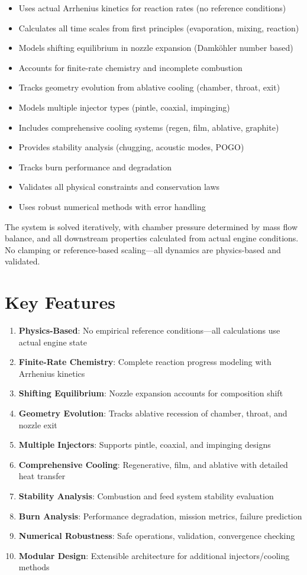 \documentclass[12pt,a4paper]{article}
\begin{document}
\begin{itemize}
    \item Uses actual Arrhenius kinetics for reaction rates (no reference conditions)
    \item Calculates all time scales from first principles (evaporation, mixing, reaction)
    \item Models shifting equilibrium in nozzle expansion (Damköhler number based)
    \item Accounts for finite-rate chemistry and incomplete combustion
    \item Tracks geometry evolution from ablative cooling (chamber, throat, exit)
    \item Models multiple injector types (pintle, coaxial, impinging)
    \item Includes comprehensive cooling systems (regen, film, ablative, graphite)
    \item Provides stability analysis (chugging, acoustic modes, POGO)
    \item Tracks burn performance and degradation
    \item Validates all physical constraints and conservation laws
    \item Uses robust numerical methods with error handling
\end{itemize}

The system is solved iteratively, with chamber pressure determined by mass flow balance, and all downstream properties calculated from actual engine conditions. No clamping or reference-based scaling—all dynamics are physics-based and validated.

\section{Key Features}

\begin{enumerate}
    \item \textbf{Physics-Based}: No empirical reference conditions—all calculations use actual engine state
    \item \textbf{Finite-Rate Chemistry}: Complete reaction progress modeling with Arrhenius kinetics
    \item \textbf{Shifting Equilibrium}: Nozzle expansion accounts for composition shift
    \item \textbf{Geometry Evolution}: Tracks ablative recession of chamber, throat, and nozzle exit
    \item \textbf{Multiple Injectors}: Supports pintle, coaxial, and impinging designs
    \item \textbf{Comprehensive Cooling}: Regenerative, film, and ablative with detailed heat transfer
    \item \textbf{Stability Analysis}: Combustion and feed system stability evaluation
    \item \textbf{Burn Analysis}: Performance degradation, mission metrics, failure prediction
    \item \textbf{Numerical Robustness}: Safe operations, validation, convergence checking
    \item \textbf{Modular Design}: Extensible architecture for additional injectors/cooling methods
\end{enumerate}
\end{document}

